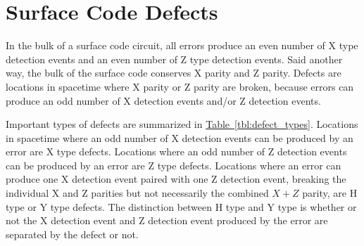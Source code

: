 \documentclass[onecolumn,unpublished,a4paper]{quantumarticle}
\theoremstyle{definition}
\theoremstyle{definition}
\theoremstyle{definition}
\newcommand{\tbl}[1]{\hyperref[tbl:#1]{Table~\ref*{tbl:#1}}}
\begin{document}
\printbibliography

\appendix

\section{Surface Code Defects}
\label{app:defects}

\begin{table}[H]
    \centering
    \caption{
        Summary of types of defects in surface code circuits.
    }
    \label{tbl:defect_types}
\end{table}

In the bulk of a surface code circuit, all errors produce an even number of X type detection events and an even number of Z type detection events.
Said another way, the bulk of the surface code conserves X parity and Z parity.
Defects are locations in spacetime where X parity or Z parity are broken, because errors can produce an odd number of X detection events and/or Z detection events.

Important types of defects are summarized in \tbl{defect_types}.
Locations in spacetime where an odd number of X detection events can be produced by an error are X type defects.
Locations where an odd number of Z detection events can be produced by an error are Z type defects.
Locations where an error can produce one X detection event paired with one Z detection event, breaking the individual X and Z parities but not necessarily the combined $X+Z$ parity, are H type or Y type defects.
The distinction between H type and Y type is whether or not the X detection event and Z detection event produced by the error are separated by the defect or not.
\end{document}
